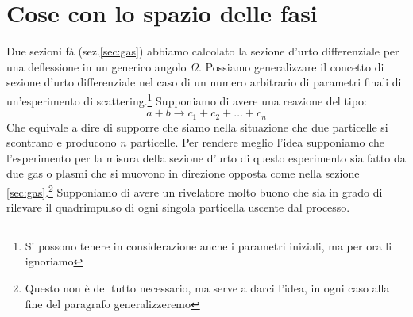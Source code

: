 \documentclass[11pt,a4paper]{report}
\begin{document}
	\section{Cose con lo spazio delle fasi}
		Due sezioni fà (sez.\ref{sec:gas}) abbiamo calcolato la sezione d'urto differenziale per una deflessione in un generico angolo $\Omega$.\newline
		Possiamo generalizzare il concetto di sezione d'urto differenziale nel caso di un numero arbitrario di parametri finali di un'esperimento di scattering.\footnote{Si possono tenere in considerazione anche i parametri iniziali, ma per ora li ignoriamo}\newline
		Supponiamo di avere una reazione del tipo:
		\begin{equation}
			a+b\rightarrow c_1+c_2+\dots+c_n
		\end{equation}
		Che equivale a dire di supporre che siamo nella situazione che due particelle si scontrano e producono $n$ particelle.\newline
		Per rendere meglio l'idea supponiamo che l'esperimento per la misura della sezione d'urto di questo esperimento sia fatto da due gas o plasmi che si muovono in direzione opposta come nella sezione \ref{sec:gas}.\footnote{Questo non è del tutto necessario, ma serve a darci l'idea, in ogni caso alla fine del paragrafo generalizzeremo}\newline
		Supponiamo di avere un rivelatore molto buono che sia in grado di rilevare il quadrimpulso di ogni singola particella uscente dal processo.\newline
\end{document}
